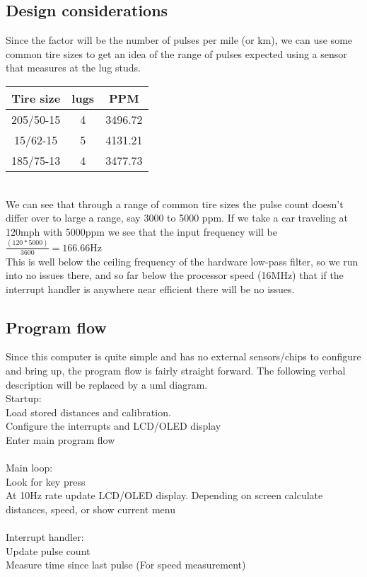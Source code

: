 \documentclass[letterpaper,11pt]{article}
\begin{document}
\subsection{Design considerations}
Since the factor will be the number of pulses per mile (or km), we can use some common tire sizes to get an idea of the range of pulses expected using a sensor that measures at the lug studs.\\
\begin{tabular}{|c|c|c|}
\hline
Tire size &  lugs & PPM\\
\hline
205/50-15 & 4 & 3496.72\\
\hline
15/62-15 & 5 & 4131.21\\
\hline
185/75-13 & 4 & 3477.73\\
\hline
\end{tabular}\\
We can see that through a range of common tire sizes the pulse count doesn't differ over to large a range, say 3000 to 5000 ppm. If we take a car traveling at 120mph with 5000ppm we see that the input frequency will be \\
\begin{math}
\frac{(120*5000)}{3600}= 166.66\mathrm{Hz}
\end{math}\\
This is well below the ceiling frequency of the hardware low-pass filter, so we run into no issues there, and so far below the processor speed (16MHz) that if the interrupt handler is anywhere near efficient there will be no issues.

\subsection{Program flow}
Since this computer is quite simple and has no external sensors/chips to configure and bring up, the program flow is fairly straight forward. The following verbal description will be replaced by a uml diagram.\\

\noindent{}Startup:\\
Load stored distances and calibration.\\
Configure the interrupts and LCD/OLED display\\
Enter main program flow\\
\\
Main loop:\\
Look for key press\\
At 10Hz rate update LCD/OLED display. Depending on screen calculate distances, speed, or show current menu\\
\\
Interrupt handler:\\
Update pulse count\\
Measure time since last pulse (For speed measurement)\\
\end{document}
